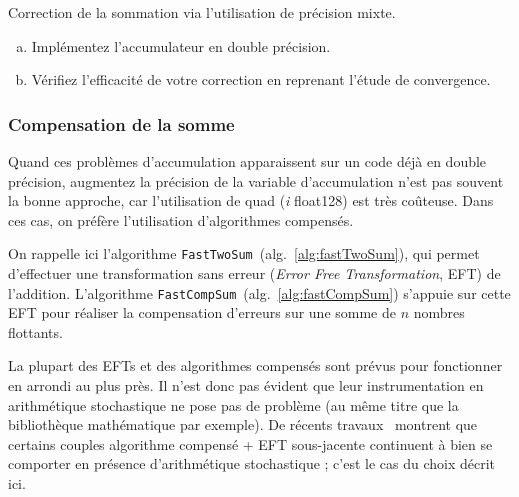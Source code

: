 \documentclass[a4paper]{article}
\newcounter{Question}
\newenvironment{question}[1][\unskip]{
  \bigskip
  \stepcounter{Question}
  \def\questionTitle{ #1}
  \begin{mdframed}[style=question]
  }{
  \end{mdframed}
}
\newenvironment{info}[1][NB :]{
  \begin{mdframed}[style=info]
    \noindent{\bf #1}
}{
  \end{mdframed}
}
\begin{document}
\begin{question}
  Correction de la sommation via l'utilisation de précision mixte.
  \begin{enumerate}[(a)]
  \item Implémentez l'accumulateur en double précision.
  \item Vérifiez l'efficacité de votre correction en reprenant l'étude de
    convergence.
  \end{enumerate}
\end{question}


\subsubsection{Compensation de la somme}
\label{sec:fix.sum}
Quand ces problèmes d'accumulation apparaissent sur un code déjà en double
précision, augmentez la précision de la variable d'accumulation n'est
pas souvent la bonne approche, car l'utilisation de quad (\textit{i} float128) est très
coûteuse. Dans ces cas, on préfère l'utilisation d'algorithmes
compensés.


On rappelle ici l'algorithme \texttt{FastTwoSum}~(alg.~\ref{alg:fastTwoSum}),
qui permet d'effectuer une transformation sans erreur (\textit{Error Free
  Transformation}, EFT) de l'addition. L'algorithme
\texttt{FastCompSum}~(alg.~\ref{alg:fastCompSum}) s'appuie sur cette EFT pour
réaliser la compensation d'erreurs sur une somme de $n$ nombres flottants.

\begin{info}
  La plupart des EFTs et des algorithmes compensés sont prévus pour fonctionner
  en arrondi au plus près. Il n'est donc pas évident que leur instrumentation en
  arithmétique stochastique ne pose pas de problème (au même titre que la
  bibliothèque mathématique par exemple). De récents travaux~\cite{graillat2018}
  montrent que certains couples algorithme compensé + EFT sous-jacente
  continuent à bien se comporter en présence d'arithmétique stochastique ; c'est
  le cas du choix décrit ici.
\end{info}
\end{document}

